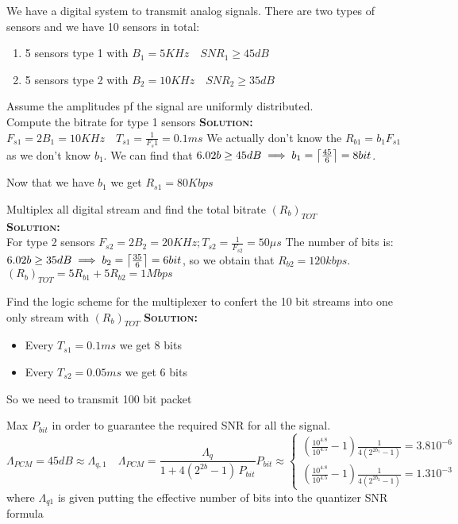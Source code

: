 \begin{exercize}
We have a digital system to transmit analog signals. There are two types of sensors and we have 10 sensors in total:
\begin{enumerate}
  \item 5 sensors type 1  with $B_1 = 5KHz \quad SNR_1 \ge 45dB$
  \item 5 sensors type 2  with $B_2 = 10KHz \quad SNR_2 \ge 35dB$
\end{enumerate}
Assume the amplitudes pf the signal are uniformly distributed.\\
\proofpart
Compute the bitrate for type 1 sensors
\textsc{\textbf{Solution:}}
\\
$F_{s1} = 2 B_1 = 10KHz \quad T_{s1} = \frac{1}{F_s1} = 0.1ms$
We actually don't know the $R_{b1} = b_1 F_{s1}$ as we don't know $b_1$. We can find that $6.02b \ge 45dB \implies b_1 = \ceil*{\frac{45}{6}} = 8 bit$.

Now that we have $b_1$ we get $R_{s1} = 80Kbps$

\proofpart
Multiplex all digital stream and find the total bitrate $(R_b)_{TOT}$\\
\textsc{\textbf{Solution:}}
\\
For type 2 sensors $F_{s2} = 2B_2 = 20KHz ; T_{s2} = \frac{1}{F_{s2}} = 50\mu s$
The number of bits is:
$6.02b \ge 35dB \implies b_2 = \ceil*{\frac{35}{6}} = 6 bit$, so we obtain that $R_{b2} = 120kbps$.
\\
$(R_b)_{TOT} = 5 R_{b1}+ 5 R_{b2} = 1Mbps$

\proofpart
Find the logic scheme for the multiplexer to confert the 10 bit streams into one only stream with $(R_b)_{TOT}$
\textsc{\textbf{Solution:}}
\\
\begin{itemize}
  \item Every $ T_{s1} = 0.1 ms$ we get 8 bits
  \item Every $ T_{s2} = 0.05 ms$ we get 6 bits
\end{itemize}
So we need to transmit 100 bit packet

\proofpart
Max $P_{bit}$ in order to guarantee the required SNR for all the signal.
\begin{equation}
  \Lambda_{PCM} = 45dB \approx \Lambda_{q,1} \quad \Lambda_{PCM} = \frac{\Lambda_q}{1+4\left(2^{2b}-1\right)\, P_{bit}}
P_{bit} \approx \begin{cases}
\left(\frac{10^{4.8}}{10^{4.5}}-1\right) \frac{1}{4(2^{2b_1}-1)} = 3.8 10^{-6}\\
\left(\frac{10^{4.8}}{10^{4.5}}-1\right) \frac{1}{4(2^{2b_2}-1)} = 1.3 10^{-3}
\end{cases}
\end{equation}
where $\Lambda_{q1}$ is given putting the effective number of bits into the quantizer SNR formula
\end{exercize}
